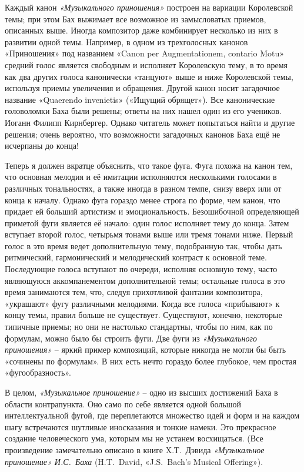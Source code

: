 \documentclass[../main.tex]{subfiles}
\begin{document}
Каждый канон \emph{«Музыкального приношения»} построен на вариации Королевской темы; при этом Бах выжимает все возможное из замысловатых приемов, описанных выше. Иногда композитор даже комбинирует несколько из них в развитии одной темы. Например, в одном из трехголосных канонов «Приношения» под названием «Canon per Augmentationem, contario Motu» средний голос является свободным и исполняет Королевскую тему, в то время как два других голоса канонически «танцуют» выше и ниже Королевской темы, используя приемы увеличения и обращения. Другой канон носит загадочное название «Quaerendo invenietis» («Ищущий обрящет»). Все канонические головоломки Баха были решены; ответы на них нашел один из его учеников. Иоганн Филипп Кирнбергер. Однако читатель может попытаться найти и другие решения; очень вероятно, что возможности загадочных канонов Баха ещё не исчерпаны до конца!

Теперь я должен вкратце объяснить, что такое фуга. Фуга похожа на канон тем, что основная мелодия и её имитации исполняются несколькими голосами в различных тональностях, а также иногда в разном темпе, снизу вверх или от конца к началу. Однако фуга гораздо менее строга по форме, чем канон, что придает ей больший артистизм и эмоциональность. Безошибочной определяющей приметой фуги является её начало: один голос исполняет тему до конца. Затем вступает второй голос, четырьмя тонами выше или тремя тонами ниже. Первый голос в это время ведет дополнительную тему, подобранную так, чтобы дать ритмический, гармонический и мелодический контраст к основной теме. Последующие голоса вступают по очереди, исполняя основную тему, часто являющуюся аккомпанементом дополнительной темы; остальные голоса в это время занимаются тем, что, следуя прихотливой фантазии композитора, «украшают» фугу различными мелодиями. Когда все голоса «прибывают» к концу темы, правил больше не существует. Существуют, конечно, некоторые типичные приемы; но они не настолько стандартны, чтобы по ним, как по формулам, можно было бы строить фуги. Две фуги из \emph{«Музыкального приношения»} \--- яркий пример композиций, которые никогда не могли бы быть «сочинены по формулам». В них есть нечто гораздо более глубокое, чем простая «фугообразность».

В целом, \emph{«Музыкальное приношение»} \--- одно из высших достижений Баха в области контрапункта. Оно само по себе является одной большой интеллектуальной фугой, где переплетаются множество идей и форм и на каждом шагу встречаются шутливые иносказания и тонкие намеки. Это прекрасное создание человеческого ума, которым мы не устанем восхищаться. (Все произведение замечательно описано в книге X.Т.~Дэвида \emph{«Музыкальное приношение» И.С.~Баха} (H.T.~David, «J.S.~Bach's Musical Offering»).
\end{document}

